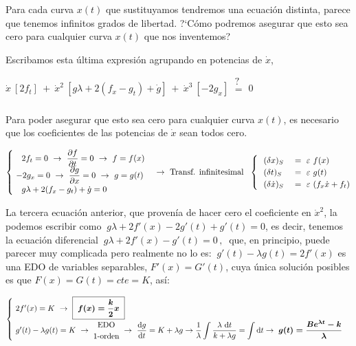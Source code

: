  \vspace{4mm}
 Para cada curva $x(t)$ que sustituyamos tendremos una ecuación distinta, parece que tenemos infinitos grados de libertad. ?`Cómo podremos asegurar que esto sea cero para cualquier curva $x(t)$ que nos inventemos?
 
 Escribamos esta última expresión agrupando en potencias de $\dot x$,
 
 $\displaystyle \dot x \ [2f_t] \ + \ \dot x^2 \ [g \lambda + 2(f_x-g_t) + \dot g] \ + \ \dot x^3 \ [-2g_x] \ \begin{matrix} \textbf{?} \\ = \\  \\ \end{matrix} \ 0$
 
 Para poder asegurar que esto sea cero para cualquier curva $x(t)$, es necesario que los coeficientes de las potencias de $\dot x$ sean todos cero.
 
 $\begin{cases}
\ \ \ 2f_t=0 \ \to \ \displaystyle \pdv{f}{t}=0 \ \to \ f=f(x) \\
\ - 2g_x=0 \ \to \ \displaystyle	 \pdv{g}{x}=0 \ \to \ g=g(t) \\
\ \ \ g\lambda + 2(f_x-g_t)+	\dot g=0
\end{cases} \to \text{ Transf. infinitesimal } \
\begin{cases}
\ \ (\var x)_S & \ = \ \varepsilon \ f(x) \\
\ \ (\var t)_S & \ = \ \varepsilon \ g(t) \\
\ \ (\var \dot x)_S & \ = \ \varepsilon \ (f_x \dot x + f_t)
\end{cases}$

La tercera ecuación anterior, que provenía de hacer cero el coeficiente en $\dot x^2$, la podemos escribir como  $\ g \lambda + 2 f'(x)-2g'(t)+g'(t)=0$, es decir, tenemos la ecuación diferencial $\ g\lambda+ 2 f'(x)-g'(t)=0\, , \ $ que, en principio, puede parecer muy complicada pero realmente no lo es:
$\ g'(t)-\lambda g(t)=2f'(x)$ es una EDO de variables separables, $F'(x)=G'(t)$, cuya única solución posibles es que $F(x)=G(t)=cte=K$, así:

$\begin{cases}
\ 2f'(x)=K \ \to \ 	\boldsymbol{\boxed{\  f(x)=\dfrac k 2 x \ }} \\
\ g'(t)-\lambda g(t)=K  \ \to \ \begin{matrix} \text{EDO} \\ \text{1-orden} \end{matrix} \ \to  \ \displaystyle \dv{g}{t}=K+\lambda g \to \dfrac 1 \lambda \int
 \dfrac{\lambda \ \dd t}{k+\lambda g}=\int \dd t \to \boldsymbol{ \ g(t)=\dfrac{B e^{\lambda t}-k}{\lambda}}
 \end{cases}$
 
